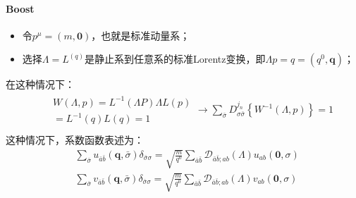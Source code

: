 \paragraph*{Boost} 
\begin{itemize}
  \item 令$p^\mu=(m,\boldsymbol{0})$，也就是标准动量系；
  \item 选择$\Lambda=L^(q)$是静止系到任意系的标准Lorentz变换，即$\Lambda p=q=(q^0,\boldsymbol{q})$；
\end{itemize}
在这种情况下：
\[\begin{aligned}
    &\begin{aligned}
    &W(\Lambda,p)=L^{-1}(\Lambda P)\Lambda L(p)\\
    &=L^{-1}(q) L(q)=1
    \end{aligned}\to\sum_{\bar{\sigma}}D_{\sigma \bar{\sigma}}^{j_n}\!\left\{W^{-1}(\Lambda,p)\right\} =1\\
\end{aligned}\]
这种情况下，系数函数表述为：
\begin{subequations}\label{u_boost_massive}
    \begin{align}
        &\sum_{\bar{\sigma}}u_{\bar{a}\bar{b}}( \boldsymbol{q},\bar{\sigma})\delta_{\bar{\sigma}\sigma}=\sqrt{\frac{m}{q^0}}\sum_{\bar{a}\bar{b}}\mathscr{D}_{\bar{a}\bar{b};ab}(\Lambda)u_{ab}(\boldsymbol{0},\sigma)
        \\
        &\sum_{\bar{\sigma}}v_{\bar{a}\bar{b}}( \boldsymbol{q},\bar{\sigma})\delta_{\bar{\sigma}\sigma}=\sqrt{\frac{m}{q^0}}\sum_{\bar{a}\bar{b}}\mathscr{D}_{\bar{a}\bar{b};ab}(\Lambda)v_{ab}(\boldsymbol{0},\sigma)
    \end{align}
\end{subequations}

